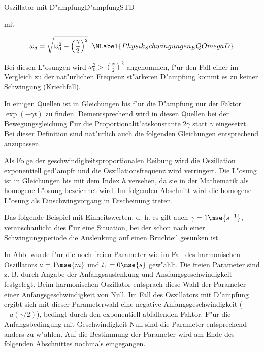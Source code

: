 \begin{MXContent}{Oszillator mit D"ampfung}{D"ampfung}{STD}
\begin{MInfo}
mit

\begin{equation}
\omega_d = \sqrt{\omega_0^2-\left(\frac{\gamma}{2}\right)^2}\; .\MLabel{Physik_Schwingungen_EQOmegaD}
\end{equation}

Bei diesen L"osungen wird $\omega_0^2 > \left(\frac{\gamma}{2}\right)^2$ angenommen, f"ur den Fall einer im Vergleich zu der nat"urlichen Frequenz st"arkeren D"ampfung kommt es zu keiner Schwingung (Kriechfall).

\end{MInfo}

In einigen Quellen ist in Gleichungen  bis  f"ur die D"ampfung nur der Faktor $\exp\left(-\gamma t\right)$ zu finden. Dementsprechend wird in diesen Quellen bei der Bewegungsgleichung  f"ur die Proportionalit"atskonstante $2\gamma$ statt $\gamma$ eingesetzt. Bei dieser Definition sind nat"urlich auch die folgenden Gleichungen entsprechend anzupassen.

Als Folge der geschwindigkeitsproportionalen Reibung wird die Oszillation exponentiell ged"ampft und die Oszillationsfrequenz wird verringert. Die L"osung ist in Gleichungen  bis  mit dem Index $h$ versehen, da sie in der Mathematik als homogene L"osung bezeichnet wird. Im folgenden Abschnitt wird die homogene L"osung als Einschwingvorgang in Erscheinung treten.

Das folgende Beispiel mit Einheitswerten, d. h. es gilt auch $\gamma = 1\mse{s^{-1}}$, veranschaulicht dies f"ur eine Situation, bei der schon nach einer Schwingungsperiode die Auslenkung auf einen Bruchteil gesunken ist.

\begin{MExample}
\begin{center}
  \end{center}

\end{MExample}

In Abb.  wurde f"ur die noch freien Parameter wie im Fall des harmonischen Oszillators $a=1\mse{m}$ und $t_1 = 0\mse{s}$ gew"ahlt. Die freien Parameter sind z. B. durch Angabe der Anfangsauslenkung und Ansfangsgeschwindigkeit festgelegt. Beim harmonischen Oszillator entsprach diese Wahl der Parameter einer Anfangsgeschwindigkeit von Null. Im Fall des Oszillators mit D"ampfung ergibt sich mit dieser Parameterwahl eine negative Anfangsgeschwindigkeit ($-a(\gamma/2)$), bedingt durch den exponentiell abfallenden Faktor. F"ur die Anfangsbedingung mit Geschwindigkeit Null sind die Parameter entsprechend anders zu w"ahlen. Auf die Bestimmung der Parameter wird am Ende des folgenden Abschnittes nochmals eingegangen.


\end{MXContent}
